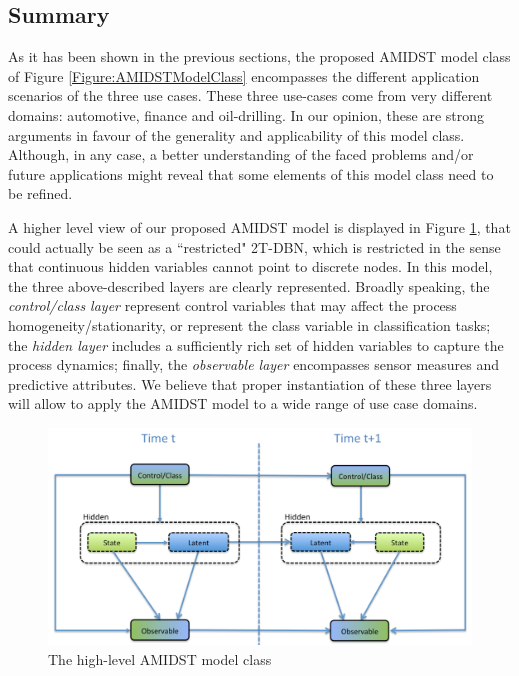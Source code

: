 \subsection{Summary}\label{summaryAMIDSTModels}

As it has been shown in the previous sections, the proposed AMIDST model class of Figure \ref{Figure:AMIDSTModelClass} encompasses the different application scenarios of the three use cases. These three use-cases come from very different domains: automotive, finance and oil-drilling. In our opinion, these are strong arguments in favour of the generality and applicability of this model class. Although, in any case, a better understanding of the faced problems and/or future applications might reveal that some elements of this model class need to be refined.  

A higher level view of our proposed AMIDST model is displayed in Figure \ref{Figure:AMIDSTModelClassHighLevel}, that could actually be seen as a ``restricted" 2T-DBN, which is restricted in the sense that continuous hidden variables cannot point to discrete nodes. In this model, the three above-described layers are clearly represented. Broadly speaking, the \textit{control/class layer} represent control variables that may affect the process homogeneity/stationarity, or represent the class variable in classification tasks; the \textit{hidden layer} includes a sufficiently rich set of hidden variables to capture the process dynamics; finally, the \textit{observable layer} encompasses sensor measures and predictive attributes. We believe that proper instantiation of these three layers will allow to apply the AMIDST model to a wide range of use case domains.


\begin{figure}[ht!]
\begin{center}
\includegraphics[scale=0.4]{./figures/AMIDSTModelClassGeneral}
\caption{\label{Figure:AMIDSTModelClassHighLevel} The high-level AMIDST model class}
\end{center}
\end{figure}



